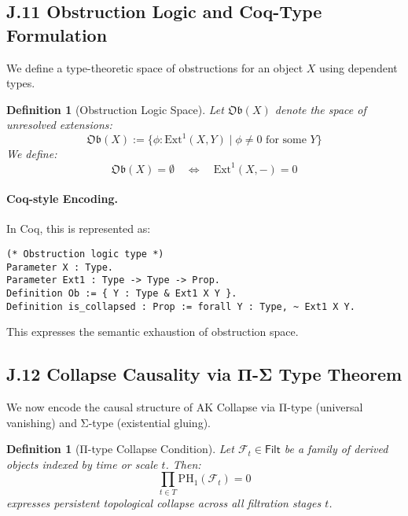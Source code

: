 \documentclass[11pt]{article}
\newtheorem{definition}[theorem]{Definition}
\begin{document}
\begin{axiom}
\begin{axiom}

\subsection*{J.11 Obstruction Logic and Coq-Type Formulation}

We define a type-theoretic space of obstructions for an object \(X\) using dependent types.

\begin{definition}[Obstruction Logic Space]
Let \(\mathfrak{Ob}(X)\) denote the space of unresolved extensions:
\[
\mathfrak{Ob}(X) := \{ \phi : \mathrm{Ext}^1(X, Y) \mid \phi \neq 0 \text{ for some } Y \}
\]
We define:
\[
\mathfrak{Ob}(X) = \emptyset \quad \Longleftrightarrow \quad \mathrm{Ext}^1(X, -) = 0
\]
\end{definition}

\paragraph{Coq-style Encoding.}
In Coq, this is represented as:

\begin{verbatim}
(* Obstruction logic type *)
Parameter X : Type.
Parameter Ext1 : Type -> Type -> Prop.
Definition Ob := { Y : Type & Ext1 X Y }.
Definition is_collapsed : Prop := forall Y : Type, ~ Ext1 X Y.
\end{verbatim}

This expresses the semantic exhaustion of obstruction space.


\subsection*{J.12 Collapse Causality via Π-Σ Type Theorem}

We now encode the causal structure of AK Collapse via Π-type (universal vanishing) and Σ-type (existential gluing).

\begin{definition}[Π-type Collapse Condition]
Let \(\mathcal{F}_t \in \mathsf{Filt}\) be a family of derived objects indexed by time or scale \(t\).  
Then:
\[
\prod_{t \in T} \mathrm{PH}_1(\mathcal{F}_t) = 0
\]
expresses persistent topological collapse across all filtration stages \(t\).
\end{definition}


\end{axiom}
\end{axiom}
\end{document}
